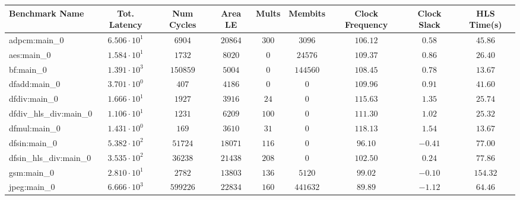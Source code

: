 \begin{tabular}{|l|c|c|c|c|c|c|c|c|}
\hline
Benchmark Name          & Tot. Latency           & Num Cycles & Area LE    & Mults    & Membits    & Clock Frequency & Clock Slack & HLS Time(s) \\
\hline
adpcm:main\_0           & $ 6.506 \cdot 10^{1} $ & $ 6904   $ & $ 20864  $ & $ 300  $ & $ 3096   $ & $ 106.12      $ & $ 0.58    $ & $ 45.86   $ \\
aes:main\_0             & $ 1.584 \cdot 10^{1} $ & $ 1732   $ & $ 8020   $ & $ 0    $ & $ 24576  $ & $ 109.37      $ & $ 0.86    $ & $ 26.40   $ \\
bf:main\_0              & $ 1.391 \cdot 10^{3} $ & $ 150859 $ & $ 5004   $ & $ 0    $ & $ 144560 $ & $ 108.45      $ & $ 0.78    $ & $ 13.67   $ \\
dfadd:main\_0           & $ 3.701 \cdot 10^{0} $ & $ 407    $ & $ 4186   $ & $ 0    $ & $ 0      $ & $ 109.96      $ & $ 0.91    $ & $ 41.60   $ \\
dfdiv:main\_0           & $ 1.666 \cdot 10^{1} $ & $ 1927   $ & $ 3916   $ & $ 24   $ & $ 0      $ & $ 115.63      $ & $ 1.35    $ & $ 25.74   $ \\
dfdiv\_hls\_div:main\_0 & $ 1.106 \cdot 10^{1} $ & $ 1231   $ & $ 6209   $ & $ 100  $ & $ 0      $ & $ 111.30      $ & $ 1.02    $ & $ 25.32   $ \\
dfmul:main\_0           & $ 1.431 \cdot 10^{0} $ & $ 169    $ & $ 3610   $ & $ 31   $ & $ 0      $ & $ 118.13      $ & $ 1.54    $ & $ 13.67   $ \\
dfsin:main\_0           & $ 5.382 \cdot 10^{2} $ & $ 51724  $ & $ 18071  $ & $ 116  $ & $ 0      $ & $ 96.10       $ & $ -0.41   $ & $ 77.00   $ \\
dfsin\_hls\_div:main\_0 & $ 3.535 \cdot 10^{2} $ & $ 36238  $ & $ 21438  $ & $ 208  $ & $ 0      $ & $ 102.50      $ & $ 0.24    $ & $ 77.86   $ \\
gsm:main\_0             & $ 2.810 \cdot 10^{1} $ & $ 2782   $ & $ 13803  $ & $ 136  $ & $ 5120   $ & $ 99.02       $ & $ -0.10   $ & $ 154.32  $ \\
jpeg:main\_0            & $ 6.666 \cdot 10^{3} $ & $ 599226 $ & $ 22834  $ & $ 160  $ & $ 441632 $ & $ 89.89       $ & $ -1.12   $ & $ 64.46   $ \\

\end{tabular}
